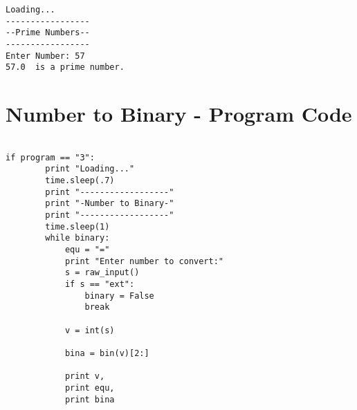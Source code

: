 \documentclass{tufte-handout}
\begin{document}

\begin{shaded}
\begin{verbatim}
Loading...
-----------------
--Prime Numbers--
-----------------
Enter Number: 57
57.0  is a prime number.
\end{verbatim}
\end{shaded}

\vspace{1cm}

\newpage

\section{Number to Binary - Program Code}


\begin{framed}
\begin{verbatim}

if program == "3":
        print "Loading..."
        time.sleep(.7)
        print "------------------"
        print "-Number to Binary-"
        print "------------------"
        time.sleep(1)
        while binary:
            equ = "="
            print "Enter number to convert:"
            s = raw_input()
            if s == "ext":
                binary = False
                break

            v = int(s) 

            bina = bin(v)[2:]  

            print v,
            print equ,
            print bina
                
\end{verbatim}
\end{framed}
\end{document}
